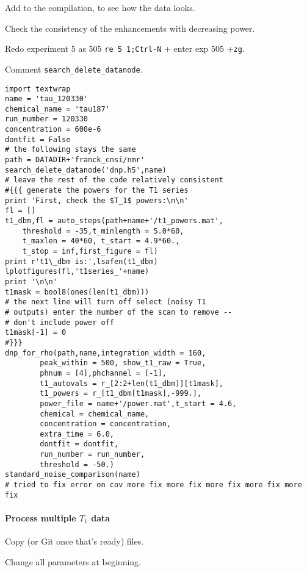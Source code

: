 Add to the compilation, to see how the data looks.

Check the consistency of the enhancements with decreasing power.

Redo experiment 5 as 505 \texttt{re 5 1;Ctrl-N} + enter exp 505 +\texttt{zg}.

Comment {\tt search\_delete\_datanode}.


\begin{scriptsize}
\begin{lstlisting}
import textwrap
name = 'tau_120330'
chemical_name = 'tau187'
run_number = 120330
concentration = 600e-6
dontfit = False
# the following stays the same
path = DATADIR+'franck_cnsi/nmr'
search_delete_datanode('dnp.h5',name)
# leave the rest of the code relatively consistent
#{{{ generate the powers for the T1 series
print 'First, check the $T_1$ powers:\n\n'
fl = []
t1_dbm,fl = auto_steps(path+name+'/t1_powers.mat',
    threshold = -35,t_minlength = 5.0*60,
    t_maxlen = 40*60, t_start = 4.9*60.,
    t_stop = inf,first_figure = fl)
print r't1\_dbm is:',lsafen(t1_dbm)
lplotfigures(fl,'t1series_'+name)
print '\n\n'
t1mask = bool8(ones(len(t1_dbm)))
# the next line will turn off select (noisy T1
# outputs) enter the number of the scan to remove --
# don't include power off
t1mask[-1] = 0
#}}}
dnp_for_rho(path,name,integration_width = 160,
        peak_within = 500, show_t1_raw = True,
        phnum = [4],phchannel = [-1],
        t1_autovals = r_[2:2+len(t1_dbm)][t1mask],
        t1_powers = r_[t1_dbm[t1mask],-999.],
        power_file = name+'/power.mat',t_start = 4.6,
        chemical = chemical_name,
        concentration = concentration,
        extra_time = 6.0,
        dontfit = dontfit,
        run_number = run_number,
        threshold = -50.)
standard_noise_comparison(name)
# tried to fix error on cov more fix more fix more fix more fix more fix
\end{lstlisting}
\end{scriptsize}

\paragraph{Process multiple $T_1$ data}
Copy (or Git once that's ready) files.

Change all parameters at beginning.

